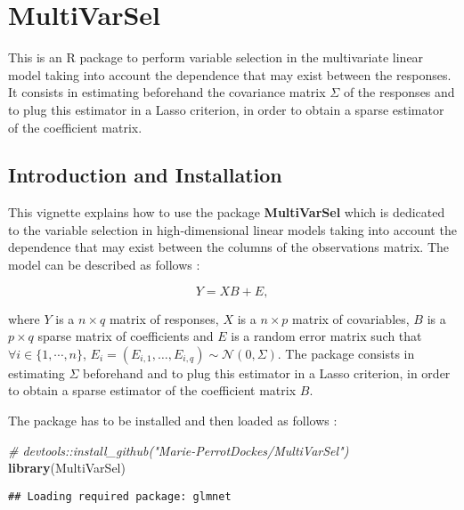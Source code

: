 \documentclass[]{article}
\title{}
\author{}
\date{}
\newenvironment{Shaded}{\begin{snugshade}}{\end{snugshade}}
\newcommand{\KeywordTok}[1]{\textcolor[rgb]{0.13,0.29,0.53}{\textbf{#1}}}
\newcommand{\CommentTok}[1]{\textcolor[rgb]{0.56,0.35,0.01}{\textit{#1}}}
\newcommand{\NormalTok}[1]{#1}
\begin{document}
\section{MultiVarSel}\label{multivarsel}

This is an R package to perform variable selection in the multivariate
linear model taking into account the dependence that may exist between
the responses. It consists in estimating beforehand the covariance
matrix \(\Sigma\) of the responses and to plug this estimator in a Lasso
criterion, in order to obtain a sparse estimator of the coefficient
matrix.

\subsection{Introduction and
Installation}\label{introduction-and-installation}

This vignette explains how to use the package \textbf{MultiVarSel} which
is dedicated to the variable selection in high-dimensional linear models
taking into account the dependence that may exist between the columns of
the observations matrix. The model can be described as follows :

\begin{equation}\label{eq:model}
Y=XB+E,
\end{equation}

where \(Y\) is a \(n\times q\) matrix of responses, \(X\) is a
\(n \times p\) matrix of covariables, \(B\) is a \(p\times q\) sparse
matrix of coefficients and \(E\) is a random error matrix such that
\(\forall i \in \{1,\cdots,n\}\),
\(E_i = (E_{i,1},\dots,E_{i,q})\sim\mathcal{N}(0,\Sigma)\). The package
consists in estimating \(\Sigma\) beforehand and to plug this estimator
in a Lasso criterion, in order to obtain a sparse estimator of the
coefficient matrix \(B\).

The package has to be installed and then loaded as follows :

\begin{Shaded}
\begin{Highlighting}[]
\CommentTok{# devtools::install_github("Marie-PerrotDockes/MultiVarSel")}
\KeywordTok{library}\NormalTok{(MultiVarSel)}
\end{Highlighting}
\end{Shaded}

\begin{verbatim}
## Loading required package: glmnet
\end{verbatim}
\end{document}
